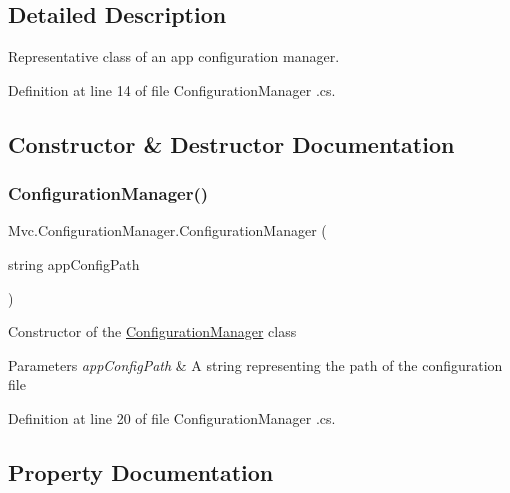 \subsection{Detailed Description}
Representative class of an app configuration manager. 



Definition at line 14 of file Configuration\+Manager .\+cs.



\subsection{Constructor \& Destructor Documentation}
\mbox{\label{class_mvc_1_1_configuration_manager_aa7a6bcdf5a3f46717d269896a2d822b1}} 
\subsubsection{\texorpdfstring{Configuration\+Manager()}{ConfigurationManager()}}
{\footnotesize\ttfamily Mvc.\+Configuration\+Manager.\+Configuration\+Manager (\begin{DoxyParamCaption}\item[{string}]{app\+Config\+Path }\end{DoxyParamCaption})}



Constructor of the \hyperlink{class_mvc_1_1_configuration_manager}{Configuration\+Manager} class 


\begin{DoxyParams}{Parameters}
{\em app\+Config\+Path} & A string representing the path of the configuration file\\
\hline
\end{DoxyParams}


Definition at line 20 of file Configuration\+Manager .\+cs.



\subsection{Property Documentation}
\mbox{\label{class_mvc_1_1_configuration_manager_a2384d0345e8093089dfff959c07e562e}} 
